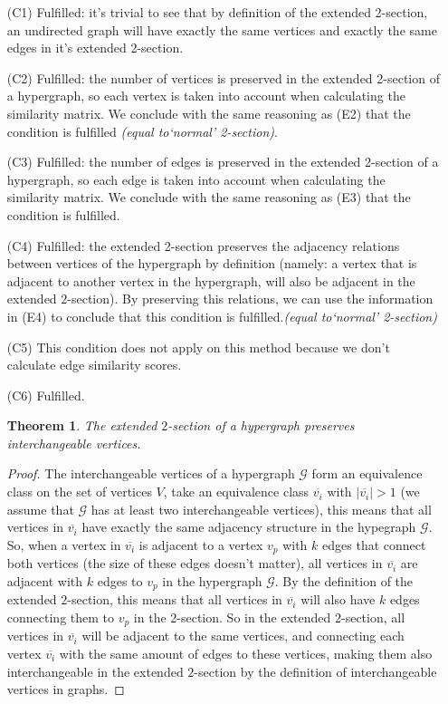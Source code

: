 \documentclass[a4paper,11pt]{report}
\newtheorem{theorem}{Theorem}[section]
\newcommand{\hgraf}{\mathcal{G}}
\begin{document}
\begin{itemize}
  \item[(C1)] Fulfilled: it's trivial to see that by definition of the extended 2-section, an undirected 
  graph will have exactly the same vertices and exactly the same edges in it's
  extended 2-section.
    \item[(C2)] Fulfilled: the number of vertices is preserved in the extended 2-section of 
  a hypergraph, so each vertex is taken into account when calculating the 
  similarity matrix. We conclude with the same reasoning as (E2) that the 
  condition is fulfilled \textit{(equal to`normal' 2-section)}.    
  \item[(C3)]  Fulfilled: the number of edges is preserved in the extended 2-section of 
  a hypergraph, so each edge is taken into account when calculating the 
  similarity matrix. We conclude with the same reasoning as (E3) that the 
  condition is fulfilled.
  \item[(C4)] Fulfilled: the extended 2-section preserves the adjacency relations between 
  vertices of the hypergraph by definition (namely: a vertex that is adjacent to another vertex in the hypergraph, will also be adjacent in the extended $2$-section). By preserving this relations, we can 
  use the information in (E4) to conclude that this condition is fulfilled.\textit{(equal to`normal' 2-section)}
  \item[(C5)]   This condition does not apply on this method because we don't calculate edge similarity scores.

  \item[(C6)] Fulfilled. \begin{theorem}
   The extended $2$-section of a hypergraph preserves interchangeable vertices.
  \end{theorem}
 \begin{proof}
   The interchangeable vertices of a hypergraph $\hgraf$ form an equivalence class on the set of vertices
   $V$, take an equivalence class $\overline{v_i}$ with $|\overline{v_i}| > 1$ (we assume that $\hgraf$ has at least two interchangeable vertices),
   this means that all vertices in $\overline{v_i}$ have exactly the same adjacency structure in the hypegraph $\hgraf$.  
   So, when a vertex in $\overline{v_i}$ is adjacent to a vertex $v_p$ with $k$ edges that connect both vertices (the size of these
   edges doesn't matter), all 
   vertices in $\overline{v_i}$ are adjacent with $k$ edges to $v_p$ in the hypergraph 
   $\hgraf$. By the definition of the extended $2$-section, this means that all vertices 
   in $\overline{v_i}$ will also have $k$ edges connecting them to $v_p$ in the 
   $2$-section. So in the extended $2$-section, all vertices in $\overline{v_i}$ will be adjacent to 
  the same vertices, and connecting each vertex $\overline{v_i}$ with the same amount of edges to these vertices, making them also
   interchangeable in the extended $2$-section by the definition of interchangeable vertices in graphs.   
   

\end{proof}
\end{itemize}
\end{document}
